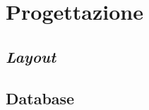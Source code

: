 \section{Progettazione}
\label{progettazione}

\subsection{\textit{Layout}}
\label{progettazione-layout}

\subsection{Database}
\label{progettazione-database}
